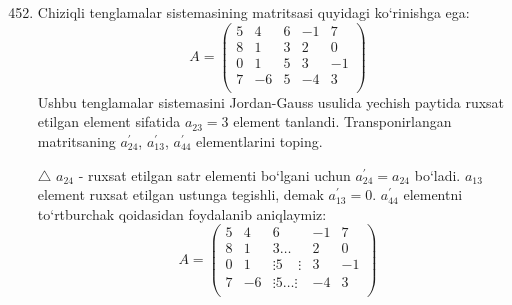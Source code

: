 \begin{enumerate} \setcounter{enumi}{451}
	\item Chiziqli tenglamalar sistemasining matritsasi quyidagi ko`rinishga ega:
	$$A=\begin{pmatrix}
	5&4&6&-1&7\\
	8&1&3&2&0\\
	0&1&5&3&-1\\
	7&-6&5&-4&3\\	
	\end{pmatrix}$$
	Ushbu tenglamalar sistemasini Jordan-Gauss usulida yechish paytida ruxsat etilgan element sifatida $a_{23}=3$ element tanlandi. Transponirlangan matritsaning $a_{24}^{\prime}$, $a_{13}^{\prime}$, $a_{44}^{\prime}$ elementlarini toping.
	
	$\triangle$ $a_{24}$ - ruxsat etilgan satr elementi bo`lgani uchun $a_{24}^{\prime}=a_{24}$ bo`ladi. $a_{13}$ element ruxsat etilgan  ustunga tegishli, demak $a_{13}^{\prime}=0$. $a_{44}^{\prime}$ elementni  to`rtburchak qoidasidan foydalanib aniqlaymiz:
	$$A=\begin{pmatrix}
		5&4&6&-1&7\\
		8&1&\boxed{3}\ldots&2&0\\
		0&1&\vdots5\ \ \ \ \ \vdots&3&-1\\
		7&-6&\vdots5\ldots\vdots&-4&3\\
	\end{pmatrix}$$
	

\end{enumerate}

